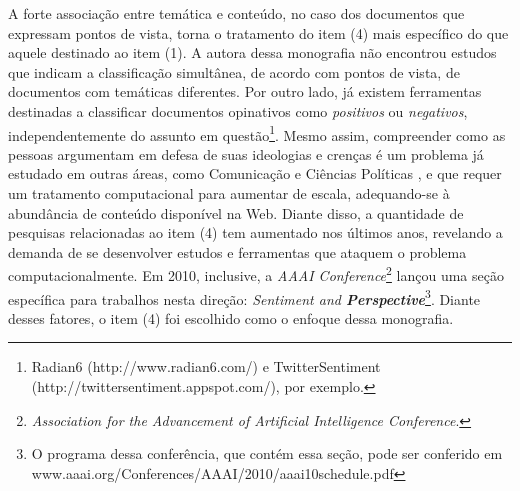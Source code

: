 A forte associação entre temática e conteúdo, no caso dos documentos que expressam pontos de vista, torna o tratamento do item (4) mais específico do que aquele destinado ao item (1). A autora dessa monografia não encontrou estudos que indicam a classificação simultânea, de acordo com pontos de vista, de documentos com temáticas diferentes. Por outro lado, já existem ferramentas destinadas a classificar documentos opinativos como \emph{positivos} ou \emph{negativos}, independentemente do assunto em questão\footnote{Radian6 (http://www.radian6.com/) e TwitterSentiment (http://twittersentiment.appspot.com/), por exemplo.}. Mesmo assim, compreender como as pessoas argumentam em defesa de suas ideologias e crenças é um problema já estudado em outras áreas, como Comunicação e Ciências Políticas \cite{gentzkow, milyo, fader}, e que requer um tratamento computacional para aumentar de escala, adequando-se à abundância de conteúdo disponível na Web. Diante disso, a quantidade de pesquisas relacionadas ao item (4) tem aumentado nos últimos anos, revelando a demanda de se desenvolver estudos e ferramentas que ataquem o problema computacionalmente. Em 2010, inclusive, a \emph{AAAI  Conference}\footnote{\emph{Association for the Advancement of Artificial Intelligence Conference}.} lançou uma seção específica para trabalhos nesta direção: \emph{Sentiment and \textbf{Perspective}}\footnote{O programa dessa conferência, que contém essa seção, pode ser conferido em www.aaai.org/Conferences/AAAI/2010/aaai10schedule.pdf}. Diante desses fatores, o item (4) foi escolhido como o enfoque dessa monografia. 

